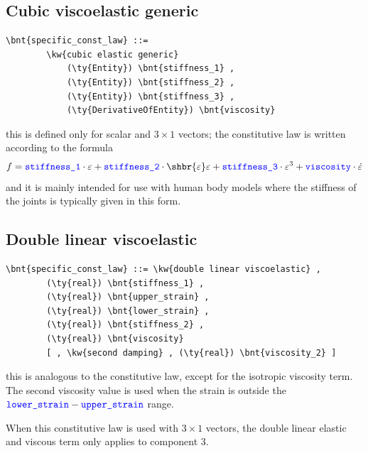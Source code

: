 \subsection{Cubic viscoelastic generic}
\begin{Verbatim}[commandchars=\\\{\}]
    \bnt{specific_const_law} ::= 
        \kw{cubic elastic generic}
            (\ty{Entity}) \bnt{stiffness_1} ,
            (\ty{Entity}) \bnt{stiffness_2} ,
            (\ty{Entity}) \bnt{stiffness_3} ,
            (\ty{DerivativeOfEntity}) \bnt{viscosity}
\end{Verbatim}
this is defined only for scalar and $3 \times 1$ vectors; the constitutive
law is written according to the formula
\begin{displaymath}
	f = \nt{stiffness\_1} \cdot \varepsilon
	+ \nt{stiffness\_2} \cdot \shbr{\varepsilon}\varepsilon
	+ \nt{stiffness\_3} \cdot \varepsilon^3
	+ \nt{viscosity} \cdot \dot{\varepsilon}
\end{displaymath}
and it is mainly intended for use with human body models 
where the stiffness of the joints is typically given in this form.

\subsection{Double linear viscoelastic}
\begin{Verbatim}[commandchars=\\\{\}]
    \bnt{specific_const_law} ::= \kw{double linear viscoelastic} ,
        (\ty{real}) \bnt{stiffness_1} ,
        (\ty{real}) \bnt{upper_strain} ,
        (\ty{real}) \bnt{lower_strain} ,
        (\ty{real}) \bnt{stiffness_2} ,
        (\ty{real}) \bnt{viscosity}
        [ , \kw{second damping} , (\ty{real}) \bnt{viscosity_2} ]
\end{Verbatim}
this is analogous to the  constitutive law,
except for the isotropic viscosity term.
The second viscosity value is used when the strain is outside the
$\textcolor{blue}{\texttt{lower\_strain}} - \textcolor{blue}{\texttt{upper\_strain}}$ range.

When this constitutive law is used with $3 \times 1$ vectors, 
the double linear elastic and viscous term only applies to component 3.
  
